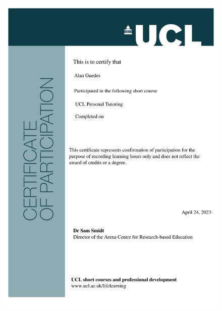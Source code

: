 \documentclass[10pt,a4paper,sans,colorlinks]{moderncv}
\begin{document}
\begin{figure}
    \includegraphics[align=t,width=\textwidth,height=0.4\textheight, keepaspectratio=true]{certificates/Personal_Tutoring.pdf}

\end{figure}
\end{document}
